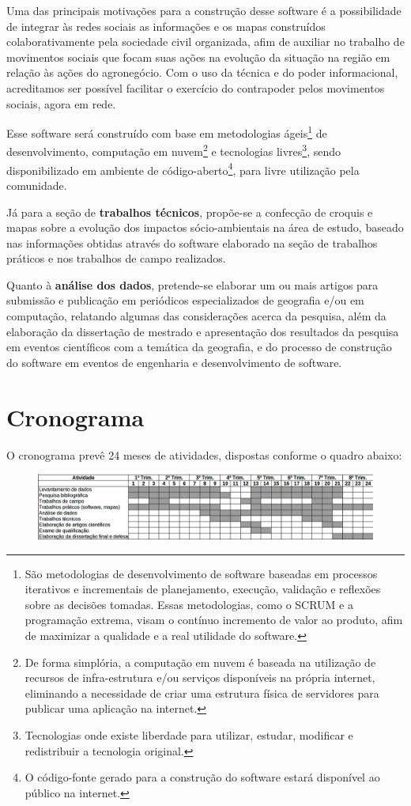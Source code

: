 Uma das principais motivações para a construção desse software é a possibilidade de integrar às redes sociais as informações e os mapas construídos colaborativamente pela sociedade civil organizada, afim de auxiliar no trabalho de movimentos sociais que focam suas ações na evolução da situação na região em relação às ações do agronegócio. Com o uso da técnica e do poder informacional, acreditamos ser possível facilitar o exercício do contrapoder pelos movimentos sociais, agora em rede.

Esse software será construído com base em metodologias ágeis\footnote{São metodologias de desenvolvimento de software baseadas em processos iterativos e incrementais de planejamento, execução, validação e reflexões sobre as decisões tomadas. Essas metodologias, como o SCRUM e a programação extrema, visam o contínuo incremento de valor ao produto, afim de maximizar a qualidade e a real utilidade do software.} de desenvolvimento, computação em nuvem\footnote{De forma simplória, a computação em nuvem é baseada na utilização de recursos de infra-estrutura e/ou serviços disponíveis na própria internet, eliminando a necessidade de criar uma estrutura física de servidores para publicar uma aplicação na internet.} e tecnologias livres\footnote{Tecnologias onde existe liberdade para utilizar, estudar, modificar e redistribuir a tecnologia original.}, sendo disponibilizado em ambiente de código-aberto\footnote{O código-fonte gerado para a construção do software estará disponível ao público na internet.}, para livre utilização pela comunidade.

Já para a seção de \textbf{trabalhos técnicos}, propõe-se a confecção de croquis e mapas sobre a evolução dos impactos sócio-ambientais na área de estudo, baseado nas informações obtidas através do software elaborado na seção de trabalhos práticos e nos trabalhos de campo realizados.

Quanto à \textbf{análise dos dados}, pretende-se elaborar um ou mais artigos para submissão e publicação em periódicos especializados de geografia e/ou em computação, relatando algumas das considerações acerca da pesquisa, além da elaboração da dissertação de mestrado e apresentação dos resultados da pesquisa em eventos científicos com a temática da geografia, e do processo de construção do software em eventos de engenharia e desenvolvimento de software.

\section{Cronograma}

O cronograma prevê 24 meses de atividades, dispostas conforme o quadro abaixo:

\begin{figure}[htb]
\begin{center}
    \includegraphics[scale=0.4]{crono.png}
\end{center}
\end{figure}

